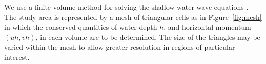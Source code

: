 \documentclass{manual}
\begin{document}
We use a finite-volume method for solving the shallow water wave
equations \cite{ZR1999}. The study area is represented by a mesh of
triangular cells as in Figure~\ref{fig:mesh} in which the conserved
quantities of  water depth $h$, and horizontal momentum $(uh, vh)$,
in each volume are to be determined. The size of the triangles may
be varied within the mesh to allow greater resolution in regions of
particular interest.

\end{document}
